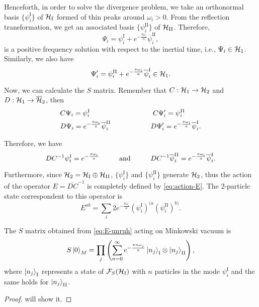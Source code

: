 Henceforth, in order to solve the divergence problem, we take an orthonormal basis \(\{\psi^{\text{I}}_i\}\) of \({\mathcal{H}}_{\text{I}}\) formed of thin peaks around \(\omega_i>0\). From the reflection transformation, we get an associated basis \(\{\psi^{\text{II}}_i\}\) of \({\mathcal{H}}_{\text{II}}\). Therefore,
\begin{equation}
    \Psi_i=\psi^{\text{I}}_i+e^{-\frac{\pi\omega_i}{a}}\overline{\psi}^\text{II}_i,
\end{equation}
is a positive frequency solution with respect to the inertial time, i.e., \(\Psi_i\in{\mathcal{H}}_1\). Similarly, we also have
\begin{equation}
    \Psi_i'=\psi^{\text{II}}_i+e^{-\frac{\pi\omega_i}{a}}\overline{\psi}^\text{I}_i\in{\mathcal{H}}_1.
\end{equation}

Now, we can calculate the \(S\) matrix. Remember that \(C:{\mathcal{H}}_1\to{\mathcal{H}}_2\) and \(D:{\mathcal{H}}_1\to\overline{{\mathcal{H}}}_2\), then
\begin{subequations}
    \begin{align}
        &C\Psi_i=\psi^\text{I}_i\hspace{3.15cm}C\Psi'_i=\psi^{\text{II}}_i\\
        &D\Psi_i=e^{-\frac{\pi\omega_i}{a}}\overline{\psi}^{\text{II}}_i\hspace{2cm}D\Psi_i'=e^{-\frac{\pi\omega_i}{a}}\overline{\psi}^\text{I}_i.
    \end{align}
\end{subequations}

Therefore, we have
\begin{equation}\label{eq:action-E}
    DC^{-1}\psi^{\text{I}}_i=e^{-\frac{\pi\omega_i}{a}}\hspace{1cm}\text{and}\hspace*{1cm}DC^{-1}\overline{\psi}^{\text{II}}_i=e^{-\frac{\pi\omega_i}{a}}\overline{\psi}^{\text{I}}_i.
\end{equation}

Furthermore, since \({\mathcal{H}}_2={\mathcal{H}}_\text{I}\oplus{\mathcal{H}}_\text{II}\), \(\{\psi_i^\text{I}\}\) and \(\{\psi_i^\text{II}\}\) generate \({\mathcal{H}}_2\), thus the action of the operator \(E=\overline{DC}^{-1}\) is completely defined by \cref{eq:action-E}. The 2-particle state correspondent to this operator is
\begin{equation}\label{eq:E-unruh}
    E^{ab}=\sum_i2e^{-\frac{\pi\omega_i}{a}}\left(\psi^{\text{I}}_i\right)^{(a}\left(\psi^{\text{II}}_i\right)^{b)}.
\end{equation}
\begin{proposition}
    The \(S\) matrix obtained from \cref{eq:E-unruh} acting on Minkowski vacuum is
    \begin{equation}
        S\ket{0}_M=\prod_j\left(\sum_{n=0}^{\infty}e^{-\frac{\pi n\omega_j}{a}}\ket{n_j}_\text{I}\otimes\ket{n_j}_\text{II}\right),
    \end{equation}
    where \(\ket{n_j}_\text{I}\) represents a state of \({\mathcal{F}}_S({\mathcal{H}}_\text{I})\) with \(n\) particles in the mode \(\psi^\text{I}_i\) and the same holds for \(\ket{n_j}_\text{II}\).
\end{proposition}
\begin{proof}
    will show it.
\end{proof}

